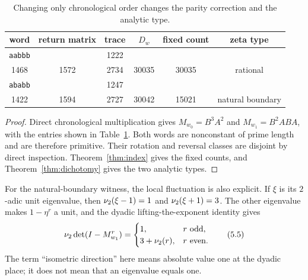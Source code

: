 \begin{table}[t]
\centering
\small
\caption{Changing only chronological order changes the parity correction and
the analytic type.}
\label{tab:witness}
\begin{tabular}{c c c c c c}
\toprule
word & return matrix & trace & \(D_w\) & fixed count & zeta type\\
\midrule
\texttt{aabbb} &
\(\left(\begin{smallmatrix}1162&1222\\1468&1572\end{smallmatrix}\right)\)&
2734&30035&30035&rational\\[2pt]
\texttt{ababb} &
\(\left(\begin{smallmatrix}1133&1247\\1422&1594\end{smallmatrix}\right)\)&
2727&30042&15021&natural boundary\\
\bottomrule
\end{tabular}
\end{table}

\begin{proof}
Direct chronological multiplication gives
\(M_{w_0}=B^3A^2\) and \(M_{w_1}=B^2ABA\), with the entries shown in
Table~\ref{tab:witness}.  Both words are nonconstant of prime length and are
therefore primitive.  Their rotation and reversal classes are disjoint by
direct inspection.  Theorem~\ref{thm:index} gives the fixed counts, and
Theorem~\ref{thm:dichotomy} gives the two analytic types.
\end{proof}

For the natural-boundary witness, the local fluctuation is also explicit.
If \(\xi\) is its \(2\)-adic unit eigenvalue, then
\(\nu_2(\xi-1)=1\) and \(\nu_2(\xi+1)=3\).  The other eigenvalue makes
\(1-\eta^r\) a unit, and the dyadic lifting-the-exponent identity gives
\[
 \nu_2\det(I-M_{w_1}^r)=
 \begin{cases}
 1,&r\text{ odd},\\
 3+\nu_2(r),&r\text{ even}.
 \end{cases}
 \tag{5.5}\label{5.5}
\]
The term ``isometric direction'' here means absolute value one at the dyadic
place; it does not mean that an eigenvalue equals one.
